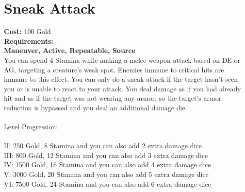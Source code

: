 \section*{Sneak Attack}
\textbf{Cost:} 100 Gold\\
\textbf{Requirements:} -\\
\textbf{Maneuver, Active, Repeatable, Source}\\
You can spend 4 Stamina while making a melee weapon attack based on DE or AG, targeting a creature’s weak spot. Enemies immune to critical hits are immune to this effect. You can only do a sneak attack if the target hasn’t seen you or is unable to react to your attack. You deal damage as if you had already hit and as if the target was not wearing any armor, so the target’s armor reduction is bypassed and you deal an additional damage die.\\
\\
Level Progression:\\
\\
II: 250 Gold, 8 Stamina and you can also add 2 extra damage dice\\
III: 800 Gold, 12 Stamina and you can also add 3 extra damage dice\\
IV: 1500 Gold, 16 Stamina and you can also add 4 extra damage dice\\
V: 3000 Gold, 20 Stamina and you can also add 5 extra damage dice\\
VI: 7500 Gold, 24 Stamina and you can also add 6 extra damage dice\\